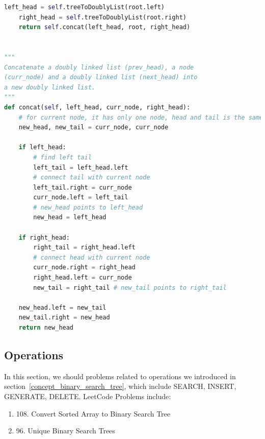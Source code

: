 \documentclass[../main.tex]{subfiles}
\begin{document}
\begin{examples}[resume]
\begin{lstlisting}[language=Python]
    left_head = self.treeToDoublyList(root.left)
    right_head = self.treeToDoublyList(root.right)
    return self.concat(left_head, root, right_head)


"""
Concatenate a doubly linked list (prev_head), a node
(curr_node) and a doubly linked list (next_head) into
a new doubly linked list.
"""
def concat(self, left_head, curr_node, right_head):
    # for current node, it has only one node, head and tail is the same
    new_head, new_tail = curr_node, curr_node
    
    if left_head:
        # find left tail
        left_tail = left_head.left 
        # connect tail with current node
        left_tail.right = curr_node
        curr_node.left = left_tail
        # new_head points to left_head
        new_head = left_head  
    
    if right_head:
        right_tail = right_head.left
        # connect head with current node
        curr_node.right = right_head
        right_head.left = curr_node
        new_tail = right_tail # new_tail points to right_tail
    
    new_head.left = new_tail
    new_tail.right = new_head
    return new_head
\end{lstlisting}
\end{examples}

\subsection{Operations} 
In this section, we should problems related to operations we introduced in section~\ref{concept_binary_search_tree}, which include SEARCH, INSERT, GENERATE, DELETE. LeetCode Problems include:
\begin{enumerate}
    \item 108. Convert Sorted Array to Binary Search Tree 
    \item 96. Unique Binary Search Trees
\end{enumerate}
\end{document}
